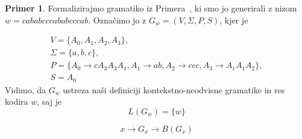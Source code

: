\documentclass{amsart}
\theoremstyle{definition} %
\newtheorem{primer}[definicija]{Primer}
\theoremstyle{plain} %
\begin{document}
\begin{primer}
    
    Formalizirajmo gramatiko iz Primera~, ki smo jo generirali z nizom
    $ w = cababcccababcccab $. Označimo jo z $ G_w = ( V, \Sigma, P, S ) $, kjer je 

    \begin{gather*}
         V = \{ A_0, A_1, A_2, A_3 \}, \\
         \Sigma = \{ a, b, c \}, \\
         P = \{ A_0  \rightarrow  cA_3A_3A_1, A_1  \rightarrow  ab, A_2  
        \rightarrow  ccc, A_3  \rightarrow  A_1A_1A_2 \}, \\
         S = A_0
    \end{gather*}
    Vidimo, da $ G_w $ ustreza naši definiciji kontekstno-neodvisne gramatike
    in res kodira $ w $, saj je 
    \[
        L(G_w) = \{w\}
    \]

\end{primer}



\[
    x \rightarrow G_x \rightarrow B(G_x)
\]
\end{document}
